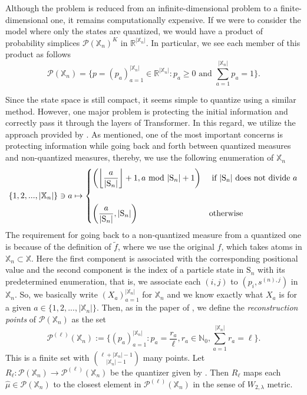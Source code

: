 \documentclass[11pt]{article}
\newcommand{\RR}{\mathbb{R}}
\newcommand{\NN}{\mathbb{N}}
\newcommand{\XX}{\mathbb{X}}
\newcommand{\cP}{\mathcal{P}}
\begin{document}
Although the problem is reduced from an infinite-dimensional problem to a finite-dimensional one, it remains computationally expensive. If we were to consider the model where only the states are quantized, we would have a product of probability simplices $\cP(\XX_n)^K$ in $\RR^{|\XX_n|}$. In particular, we see each member of this product as follows
\begin{equation}
\cP(\XX_n) = \{p = (p_a)_{a=1}^{|\XX_n|}\in\RR^{|\XX_n|} : p_a \geq 0 \text{ and } \sum_{a=1}^{|\XX_n|} p_a = 1\}.
\end{equation}

Since the state space is still compact, it seems simple to quantize using a similar method. However, one major problem is protecting the initial information and correctly pass it through the layers of Transformer. In this regard, we utilize the approach provided by \cite{reznik2011algorithm}. As mentioned, one of the most important concerns is protecting information while going back and forth between quantized measures and non-quantized measures, thereby, we use the following enumeration of $\XX_n$
\begin{equation}
    \{1,2,...,|\XX_n|\}\ni a \mapsto \begin{cases}
        \displaystyle\left(\bigg\lfloor\frac{a}{|\mathrm{S}_n|} \bigg\rfloor + 1, a \text{ mod } |\mathrm{S}_n| + 1\right)& \text{ if } |\mathrm{S_n}| \text{ does not divide } a\\
        \vspace{5pt}\\
        \displaystyle\left(\frac{a}{|\mathrm{S}_n|}, |\mathrm{S}_n|\right) & \text{otherwise}
    \end{cases}
\end{equation}
The requirement for going back to a non-quantized measure from a quantized one is because of the definition of $\tilde{f}$, where we use the original $f$, which takes atoms in $\XX_n \subset \XX$. Here the first component is associated with the corresponding positional value and the second component is the index of a particle state in $\mathrm{S}_n$ with its predetermined enumeration, that is, we associate each $(i,j)$ to $(p_i, s^{(n),j})$ in $\XX_n$. So, we basically write $(X_a)_{a=1}^{|\XX_n|}$ for $\XX_n$ and we know exactly what $X_a$ is for a given $a\in\{1,2,...,|\XX_n|\}$. Then, as in the paper of \cite{reznik2011algorithm}, we define the \emph{reconstruction points} of $\cP(\XX_n)$ as the set
\begin{equation}
    \cP^{(\ell)}(\XX_n) := \{(p_a)_{a=1}^{|\XX_n|}: p_a = \frac{r_a}{\ell}, r_a \in \NN_0, \sum_{a=1}^{|\XX_n|}r_a = \ell\}.
\end{equation}
This is a finite set with $\binom{\ell + |\XX_n| - 1}{|\XX_n| - 1}$ many points. Let $R_\ell: \cP(\XX_n)\to\cP^{(\ell)}(\XX_n)$ be the quantizer given by \cite[Algorithm 1]{reznik2011algorithm}. Then $R_\ell$ maps each $\hat{\mu}\in\cP(\XX_n)$ to the closest element in $\cP^{(\ell)}(\XX_n)$ in the sense of $W_{2,\lambda}$ metric.
\end{document}
